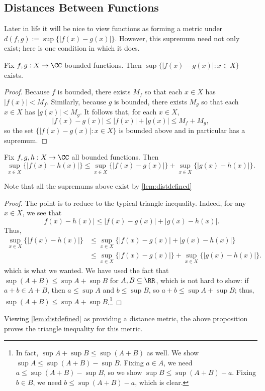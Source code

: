 \subsection{Distances Between Functions}
Later in life it will be nice to view functions as forming a metric under $d(f,g):=\sup\{|f(x)-g(x)|\}$. However, this supremum need not only exist; here is one condition in which it does.
\begin{lemma} \label{lem:distdefined}
	Fix $f,g:X\to\CC$ bounded functions. Then $\sup\{|f(x)-g(x)|:x\in X\}$ exists.
\end{lemma}
\begin{proof}
	Because $f$ is bounded, there exists $M_f$ so that each $x\in X$ has $|f(x)|<M_f$. Similarly, because $g$ is bounded, there exists $M_g$ so that each $x\in X$ has $|g(x)|<M_g$. It follows that, for each $x\in X$,
	\[|f(x)-g(x)|\le|f(x)|+|g(x)|\le M_f+M_g,\]
	so the set $\{|f(x)-g(x)|:x\in X\}$ is bounded above and in particular has a supremum.
\end{proof}
\begin{proposition}
	Fix $f,g,h:X\to\CC$ all bounded functions. Then
	\[\sup_{x\in X}\{|f(x)-h(x)|\}\le\sup_{x\in X}\{|f(x)-g(x)|\}+\sup_{x\in X}\{|g(x)-h(x)|\}.\]
\end{proposition}
Note that all the supremums above exist by \autoref{lem:distdefined}
\begin{proof}
	The point is to reduce to the typical triangle inequality. Indeed, for any $x\in X$, we see that
	\[|f(x)-h(x)|\le|f(x)-g(x)|+|g(x)-h(x)|.\]
	Thus,
	\begin{align*}
		\sup_{x\in X}\{|f(x)-h(x)|\} &\le \sup_{x\in X}\{|f(x)-g(x)|+|g(x)-h(x)|\} \\
		&\le \sup_{x\in X}\{|f(x)-g(x)|\}+\sup_{x\in X}\{|g(x)-h(x)|\}.
	\end{align*}
	which is what we wanted. We have used the fact that $\sup(A+B)\le\sup A+\sup B$ for $A,B\subseteq\RR$, which is not hard to show: if $a+b\in A+B$, then $a\le\sup A$ and $b\le\sup B$, so $a+b\le\sup A+\sup B$; thus, $\sup(A+B)\le\sup A+\sup B$.\footnote{In fact, $\sup A+\sup B\le\sup(A+B)$ as well. We show $\sup A\le\sup(A+B)-\sup B$. Fixing $a\in A$, we need $a\le\sup(A+B)-\sup B$, so we show $\sup B\le\sup(A+B)-a$. Fixing $b\in B$, we need $b\le\sup(A+B)-a$, which is clear.}
\end{proof}
\begin{remark}[Nir]
	Viewing \autoref{lem:distdefined} as providing a distance metric, the above proposition proves the triangle inequality for this metric.
\end{remark}
